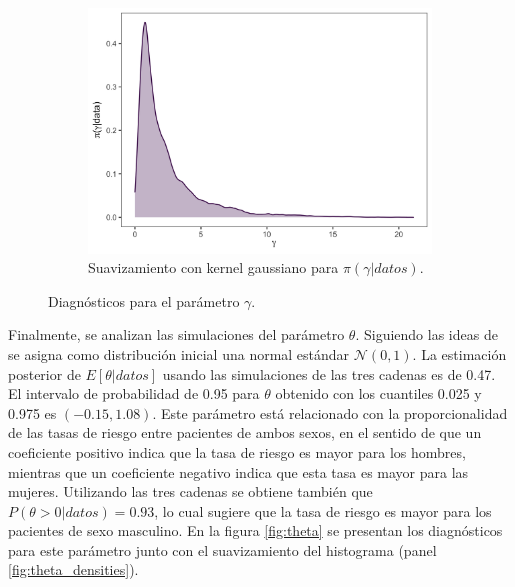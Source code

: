 \documentclass[11pt,a4paper]{article}
\begin{document}
\begin{figure}[!htb]
    \vspace{0.2cm}
    \begin{subfigure}[t]{\textwidth}
    \centering\includegraphics[width=\linewidth]{gamma_densities.png}
    \caption{Suavizamiento con kernel gaussiano para $\pi (\gamma | datos)$.}
    \label{fig:gamma_densities}
    \end{subfigure}
    \caption{Diagnósticos para el parámetro $\gamma$. }
    \label{fig:gamma}
\end{figure}

Finalmente, se analizan las simulaciones del parámetro $\theta$. Siguiendo las ideas de \citet{nieto} se asigna como distribución inicial una normal estándar $\mathcal{N}(0, 1)$. La estimación posterior de $E \left[ \theta | datos \right]$ usando las simulaciones de las tres cadenas es de 0.47. El intervalo de probabilidad de 0.95 para $\theta$ obtenido con los cuantiles 0.025 y 0.975 es $(-0.15, 1.08)$. Este parámetro está relacionado con la proporcionalidad de las tasas de riesgo entre pacientes de ambos sexos, en el sentido de que un coeficiente positivo indica que la tasa de riesgo es mayor para los hombres, mientras que un coeficiente negativo indica que esta tasa es mayor para las mujeres. Utilizando las tres cadenas se obtiene también que $P(\theta > 0 | datos) = 0.93$, lo cual sugiere que la tasa de riesgo es mayor para los pacientes de sexo masculino. En la figura \ref{fig:theta} se presentan los diagnósticos para este parámetro junto con el suavizamiento del histograma (panel \ref{fig:theta_densities}).
\end{document}
